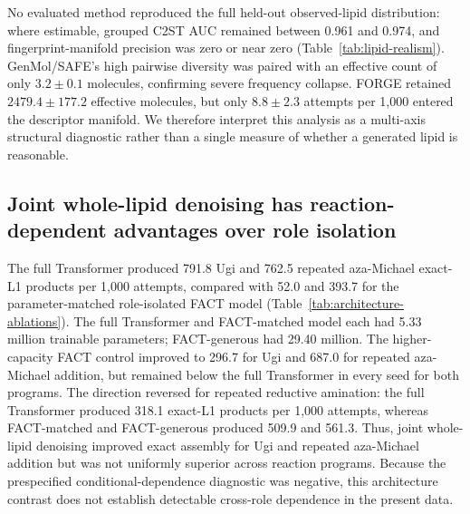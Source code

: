 \documentclass{article}
\begin{document}
No evaluated method reproduced the full held-out observed-lipid distribution: where estimable,
grouped C2ST AUC remained between 0.961 and 0.974, and fingerprint-manifold precision was zero or
near zero (Table~\ref{tab:lipid-realism}). GenMol/SAFE's high pairwise diversity was paired with an
effective count of only $3.2\pm0.1$ molecules, confirming severe frequency collapse. FORGE retained
$2479.4\pm177.2$ effective molecules, but only $8.8\pm2.3$ attempts per 1,000 entered the descriptor
manifold. We therefore interpret this analysis as a multi-axis structural diagnostic rather than a
single measure of whether a generated lipid is reasonable.

\subsection{Joint whole-lipid denoising has reaction-dependent advantages over role isolation}

The full Transformer produced 791.8 Ugi and 762.5 repeated aza-Michael exact-L1 products per 1,000
attempts, compared with 52.0 and 393.7 for the parameter-matched role-isolated FACT model
(Table~\ref{tab:architecture-ablations}). The full Transformer and FACT-matched model each had
5.33 million trainable parameters; FACT-generous had 29.40 million. The higher-capacity FACT control
improved to 296.7 for Ugi and 687.0 for repeated aza-Michael addition, but remained below the full
Transformer in every seed for both programs. The direction reversed for repeated reductive amination: the full
Transformer produced 318.1 exact-L1 products per 1,000 attempts, whereas FACT-matched and
FACT-generous produced 509.9 and 561.3. Thus, joint whole-lipid denoising improved exact assembly
for Ugi and repeated aza-Michael addition but was not uniformly superior across reaction programs.
Because the prespecified conditional-dependence diagnostic was negative, this architecture contrast
does not establish detectable cross-role dependence in the present data.
\end{document}

